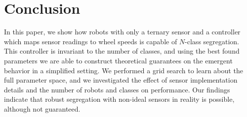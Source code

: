 \documentclass[letterpaper, 10 pt, conference]{ieeeconf}
\begin{document}
\section{Conclusion}

In this paper, we show how robots with only a ternary sensor and a controller
which maps sensor readings to wheel speeds is capable of $N$-class segregation.
This controller is invariant to the number of classes, and using the best found parameters
we are able to construct theoretical guarantees on the emergent behavior in a simplified setting.
We performed a grid search to learn about the full parameter space, and we
investigated the effect of sensor implementation details and the number of
robots and classes on performance. Our findings indicate that robust segregation
with non-ideal sensors in reality is possible, although not guaranteed.



\end{document}
